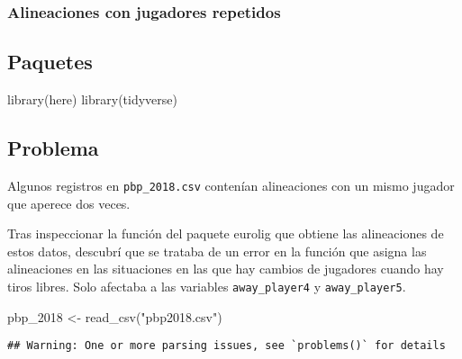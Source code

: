 \documentclass[
]{article}
\newenvironment{Shaded}{\begin{snugshade}}{\end{snugshade}}
\newcommand{\FunctionTok}[1]{\textcolor[rgb]{0.00,0.00,0.00}{#1}}
\newcommand{\NormalTok}[1]{#1}
\newcommand{\OtherTok}[1]{\textcolor[rgb]{0.56,0.35,0.01}{#1}}
\newcommand{\StringTok}[1]{\textcolor[rgb]{0.31,0.60,0.02}{#1}}
\begin{document}
\hypertarget{alineaciones-con-jugadores-repetidos}{%
\subsubsection{Alineaciones con jugadores
repetidos}\label{alineaciones-con-jugadores-repetidos}}

\hypertarget{paquetes-1}{%
\subsection{Paquetes}\label{paquetes-1}}

\begin{Shaded}
\begin{Highlighting}[]
\FunctionTok{library}\NormalTok{(here)}
\FunctionTok{library}\NormalTok{(tidyverse)}
\end{Highlighting}
\end{Shaded}

\hypertarget{problema}{%
\subsection{Problema}\label{problema}}

Algunos registros en \texttt{pbp\_2018.csv} contenían alineaciones con
un mismo jugador que aperece dos veces.

Tras inspeccionar la función del paquete eurolig que obtiene las
alineaciones de estos datos, descubrí que se trataba de un error en la
función que asigna las alineaciones en las situaciones en las que hay
cambios de jugadores cuando hay tiros libres. Solo afectaba a las
variables \texttt{away\_player4} y \texttt{away\_player5}.

\begin{Shaded}
\begin{Highlighting}[]
\NormalTok{pbp\_2018 }\OtherTok{\textless{}{-}} \FunctionTok{read\_csv}\NormalTok{(}\StringTok{"pbp2018.csv"}\NormalTok{)}
\end{Highlighting}
\end{Shaded}

\begin{verbatim}
## Warning: One or more parsing issues, see `problems()` for details
\end{verbatim}
\end{document}
